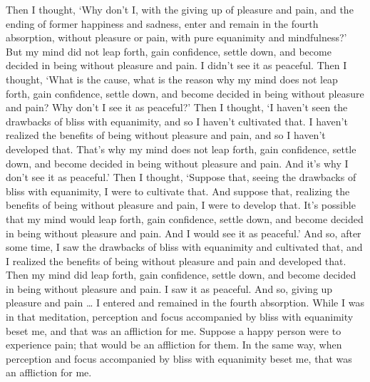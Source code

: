 \documentclass[12pt,openany]{book}%
\begin{document}
Then I thought, ‘Why don’t I, with the giving up of pleasure and pain, and the ending of former happiness and sadness, enter and remain in the fourth absorption, without pleasure or pain, with pure equanimity and mindfulness?’ But my mind did not leap forth, gain confidence, settle down, and become decided in being without pleasure and pain. I didn’t see it as peaceful. Then I thought, ‘What is the cause, what is the reason why my mind does not leap forth, gain confidence, settle down, and become decided in being without pleasure and pain? Why don’t I see it as peaceful?’ Then I thought, ‘I haven’t seen the drawbacks of bliss with equanimity, and so I haven’t cultivated that. I haven’t realized the benefits of being without pleasure and pain, and so I haven’t developed that. That’s why my mind does not leap forth, gain confidence, settle down, and become decided in being without pleasure and pain. And it’s why I don’t see it as peaceful.’ Then I thought, ‘Suppose that, seeing the drawbacks of bliss with equanimity, I were to cultivate that. And suppose that, realizing the benefits of being without pleasure and pain, I were to develop that. It’s possible that my mind would leap forth, gain confidence, settle down, and become decided in being without pleasure and pain. And I would see it as peaceful.’ And so, after some time, I saw the drawbacks of bliss with equanimity and cultivated that, and I realized the benefits of being without pleasure and pain and developed that. Then my mind did leap forth, gain confidence, settle down, and become decided in being without pleasure and pain. I saw it as peaceful. And so, giving up pleasure and pain … I entered and remained in the fourth absorption. While I was in that meditation, perception and focus accompanied by bliss with equanimity beset me, and that was an affliction for me. Suppose a happy person were to experience pain; that would be an affliction for them. In the same way, when perception and focus accompanied by bliss with equanimity beset me, that was an affliction for me. 
\end{document}
